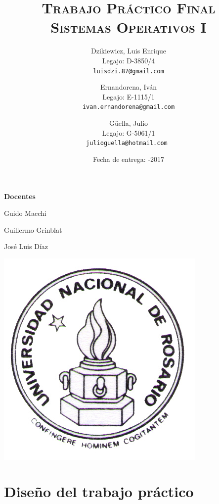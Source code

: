 \documentclass[a4paper]{article}
\author{
        Dzikiewicz, Luis Enrique\\
        Legajo: D-3850/4\\
        \texttt{luisdzi.87@gmail.com}
        \and Ernandorena, Iván\\
        Legajo: E-1115/1\\
        \texttt{ivan.ernandorena@gmail.com}
        \and Güella, Julio\\
        Legajo: G-5061/1\\
        \texttt{julioguella@hotmail.com }
}
\date{
    Fecha de entrega: -2017
}
\title {
    \Huge  \textsc{Trabajo Práctico Final\\}
    \large \textsc{Sistemas Operativos I}
}
\begin{document}

    \maketitle

    \thispagestyle{empty}

    \begin{center}
         \large \bf Docentes
    \end{center}

    \begin{center}
      Guido Macchi
      
      Guillermo Grinblat

      José Luis Díaz
        \vspace{2cm}

        \includegraphics[scale=1.5]{Logo-Unr}
    

    \end{center}


\newpage




\section*{Diseño del trabajo práctico}
\end{document}
